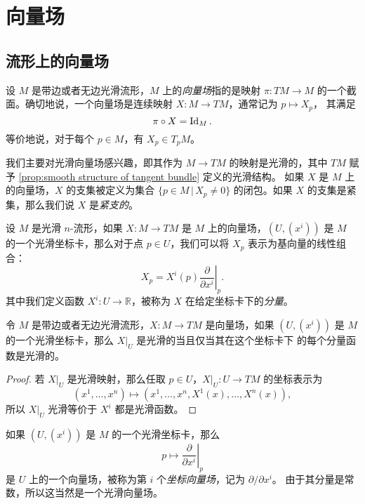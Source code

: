 
\chapter{向量场}

\section{流形上的向量场}

设 $M$ 是带边或者无边光滑流形，$M$ 上的\emph{向量场}指的是映射 $\pi:TM\to M$
的一个截面。确切地说，一个向量场是连续映射 $X:M\to TM$，通常记为 $p\mapsto X_p$，
其满足
\[
  \pi\circ X=\operatorname{Id}_M.
\]
等价地说，对于每个 $p\in M$，有 $X_p\in T_pM$。

我们主要对光滑向量场感兴趣，即其作为 $M\to TM$ 的映射是光滑的，其中 $TM$
赋予 \autoref{prop:smooth structure of tangent bundle} 定义的光滑结构。
如果 $X$ 是 $M$ 上的向量场，$X$ 的支集被定义为集合 $\{p\in M\,|\, X_p\neq 0\}$
的闭包。如果 $X$ 的支集是紧集，那么我们说 $X$ 是\emph{紧支的}。

设 $M$ 是光滑 $n$-流形，如果 $X:M\to TM$ 是 $M$ 上的向量场，$(U,(x^i))$
是 $M$ 的一个光滑坐标卡，那么对于点 $p\in U$，我们可以将 $X_p$
表示为基向量的线性组合：
\begin{equation}\label{eq:value of vector field}
  X_p=X^i(p)\left.\frac{\partial}{\partial x^i}\right|_p.
\end{equation}
其中我们定义函数 $X^i:U\to \mathbb{R}$，被称为 $X$ 在给定坐标卡下的\emph{分量}。

\begin{proposition}[向量场的光滑性判别]
  令 $M$ 是带边或者无边光滑流形，$X:M\to TM$ 是向量场，如果 $(U,(x^i))$
  是 $M$ 的一个光滑坐标卡，那么 $X|_U$ 是光滑的当且仅当其在这个坐标卡下
  的每个分量函数是光滑的。
\end{proposition}
\begin{proof}
  若 $X|_U$ 是光滑映射，那么任取 $p\in U$，$X|_U:U\to TM$ 的坐标表示为
  \[
    \left(x^1,\dots,x^n\right)\mapsto \left(x^1,\dots,x^n,X^1(x),\dots,X^n(x)\right),
  \]
  所以 $X|_U$ 光滑等价于 $X^i$ 都是光滑函数。
\end{proof}

\begin{example}[坐标向量场]
  如果 $(U,(x^i))$ 是 $M$ 的一个光滑坐标卡，那么
  \[
    p\mapsto \left.\frac{\partial}{\partial x^i}\right|_p
  \]
  是 $U$ 上的一个向量场，被称为第 $i$ 个\emph{坐标向量场}，记为 $\partial/\partial x^i$。
  由于其分量是常数，所以这当然是一个光滑向量场。
\end{example}

